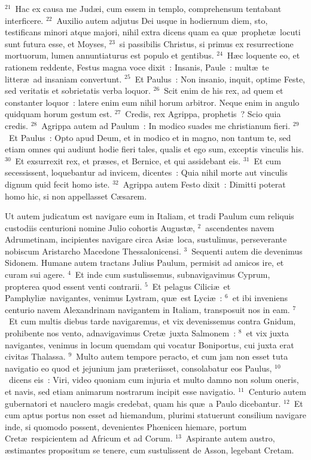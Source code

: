 ${}^{21}$~Hac ex causa me Jud\ae i, cum essem in templo, comprehensum tentabant interficere.
${}^{22}$~Auxilio autem adjutus Dei usque in hodiernum diem, sto, testificans minori atque majori, nihil extra dicens quam ea qu\ae\ prophet\ae\ locuti sunt futura esse, et Moyses,
${}^{23}$~si passibilis Christus, si primus ex resurrectione mortuorum, lumen annuntiaturus est populo et gentibus.
${}^{24}$~H\ae c loquente eo, et rationem reddente, Festus magna voce dixit~: Insanis, Paule~: mult\ae\ te litter\ae\ ad insaniam convertunt.
${}^{25}$~Et Paulus~: Non insanio, inquit, optime Feste, sed veritatis et sobrietatis verba loquor.
${}^{26}$~Scit enim de his rex, ad quem et constanter loquor~: latere enim eum nihil horum arbitror. Neque enim in angulo quidquam horum gestum est.
${}^{27}$~Credis, rex Agrippa, prophetis~? Scio quia credis.
${}^{28}$~Agrippa autem ad Paulum~: In modico suades me christianum fieri.
${}^{29}$~Et Paulus~: Opto apud Deum, et in modico et in magno, non tantum te, sed etiam omnes qui audiunt hodie fieri tales, qualis et ego sum, exceptis vinculis his.
${}^{30}$~Et exsurrexit rex, et pr\ae ses, et Bernice, et qui assidebant eis.
${}^{31}$~Et cum secessissent, loquebantur ad invicem, dicentes~: Quia nihil morte aut vinculis dignum quid fecit homo iste.
${}^{32}$~Agrippa autem Festo dixit~: Dimitti poterat homo hic, si non appellasset C\ae sarem.

\lettrine[lines=3,image=true,loversize=0.05,lraise=-0.03]{U}{}t autem judicatum est navigare eum in Italiam, et tradi Paulum cum reliquis custodiis centurioni nomine Julio cohortis August\ae ,
${}^{2}$~ascendentes navem Adrumetinam, incipientes navigare circa Asi\ae\ loca, sustulimus, perseverante nobiscum Aristarcho Macedone Thessalonicensi.
${}^{3}$~Sequenti autem die devenimus Sidonem. Humane autem tractans Julius Paulum, permisit ad amicos ire, et curam sui agere.
${}^{4}$~Et inde cum sustulissemus, subnavigavimus Cyprum, propterea quod essent venti contrarii.
${}^{5}$~Et pelagus Cilici\ae\ et Pamphyli\ae\ navigantes, venimus Lystram, qu\ae\ est Lyci\ae~:
${}^{6}$~et ibi inveniens centurio navem Alexandrinam navigantem in Italiam, transposuit nos in eam.
${}^{7}$~Et cum multis diebus tarde navigaremus, et vix devenissemus contra Gnidum, prohibente nos vento, adnavigavimus Cret\ae\ juxta Salmonem~:
${}^{8}$~et vix juxta navigantes, venimus in locum quemdam qui vocatur Boniportus, cui juxta erat civitas Thalassa.
${}^{9}$~Multo autem tempore peracto, et cum jam non esset tuta navigatio eo quod et jejunium jam pr\ae teriisset, consolabatur eos Paulus,
${}^{10}$~dicens eis~: Viri, video quoniam cum injuria et multo damno non solum oneris, et navis, sed etiam animarum nostrarum incipit esse navigatio.
${}^{11}$~Centurio autem gubernatori et nauclero magis credebat, quam his qu\ae\ a Paulo dicebantur.
${}^{12}$~Et cum aptus portus non esset ad hiemandum, plurimi statuerunt consilium navigare inde, si quomodo possent, devenientes Phœnicen hiemare, portum Cret\ae\ respicientem ad Africum et ad Corum.
${}^{13}$~Aspirante autem austro, \ae stimantes propositum se tenere, cum sustulissent de Asson, legebant Cretam.


